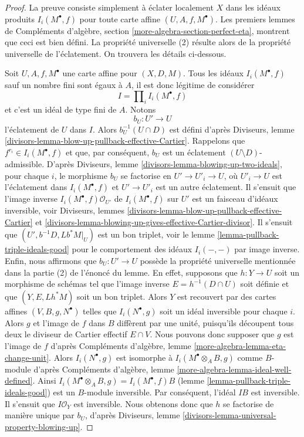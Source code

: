 \begin{proof}
La preuve consiste simplement à éclater localement $X$ dans les idéaux produits
$I_i(M^\bullet, f)$ pour toute carte affine $(U, A, f, M^\bullet)$.
Les premiers lemmes de Compléments d'algèbre, section
\ref{more-algebra-section-perfect-eta}, montrent que ceci est bien défini.
La propriété universelle (2) résulte alors de la
propriété universelle de l'éclatement.
On trouvera les détails ci-dessous.

\medskip\noindent
Soit $U, A, f, M^\bullet$ une carte affine pour $(X, D, M)$.
Tous les idéaux $I_i(M^\bullet, f)$ sauf un nombre fini sont
égaux à $A$, il est donc légitime de considérer
$$
I = \prod\nolimits_i I_i(M^\bullet, f)
$$
et c'est un idéal de type fini de $A$. Notons
$$
b_U : U' \to U
$$
l'éclatement de $U$ dans $I$. Alors $b_U^{-1}(U \cap D)$ est défini d'après
Diviseurs, lemme
\ref{divisors-lemma-blow-up-pullback-effective-Cartier}.
Rappelons que $f^{r_i} \in I_i(M^\bullet, f)$ et que, par conséquent,
$b_U$ est un éclatement $(U \setminus D)$-admissible.
D'après Diviseurs, lemme \ref{divisors-lemma-blowing-up-two-ideals},
pour chaque $i$, le morphisme $b_U$ se factorise en $U' \to U'_i \to U$,
où $U'_i \to U$ est l'éclatement dans $I_i(M^\bullet, f)$
et $U' \to U'_i$ est un autre éclatement. Il s'ensuit que
l'image inverse $I_i(M^\bullet, f)\mathcal{O}_{U'}$
de $I_i(M^\bullet, f)$ sur $U'$ est un faisceau d'idéaux inversible, voir
Diviseurs, lemmes \ref{divisors-lemma-blow-up-pullback-effective-Cartier} et
\ref{divisors-lemma-blowing-up-gives-effective-Cartier-divisor}.
Il s'ensuit que $(U', b^{-1}D, Lb^*M|_U)$ est un bon triplet, voir
le lemme \ref{lemma-pullback-triple-ideals-good}
pour le comportement des idéaux $I_i(-,-)$ par image inverse.
Enfin, nous affirmons que $b_U : U' \to U$ possède la propriété universelle
mentionnée dans la partie (2) de l'énoncé du lemme. En effet, supposons que
$h : Y \to U$ soit un morphisme de schémas tel que
l'image inverse $E = h^{-1}(D \cap U)$ soit définie et que $(Y, E, Lh^*M)$
soit un bon triplet. Alors $Y$ est recouvert par des cartes affines
$(V, B, g, N^\bullet)$ telles que $I_i(N^\bullet, g)$ soit
un idéal inversible pour chaque $i$. Alors $g$ et l'image de
$f$ dans $B$ diffèrent par une unité, puisqu'ils découpent tous deux le diviseur de Cartier
effectif $E \cap V$. Nous pouvons donc supposer que $g$ est l'image de $f$ d'après
Compléments d'algèbre, lemme \ref{more-algebra-lemma-eta-change-unit}.
Alors $I_i(N^\bullet, g)$ est isomorphe à $I_i(M^\bullet \otimes_A B, g)$
comme $B$-module d'après Compléments d'algèbre, lemme
\ref{more-algebra-lemma-ideal-well-defined}.
Ainsi $I_i(M^\bullet \otimes_A B, g) = I_i(M^\bullet, f)B$
(lemme \ref{lemma-pullback-triple-ideals-good})
est un $B$-module inversible.
Par conséquent, l'idéal $IB$ est inversible. Il s'ensuit que $I\mathcal{O}_Y$
est inversible. Nous obtenons donc que $h$ se factorise de manière unique par
$b_U$, d'après Diviseurs, lemme \ref{divisors-lemma-universal-property-blowing-up}.


\end{proof}
